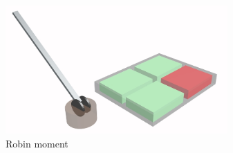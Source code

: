 \begin{figure}
	\centering
	\includegraphics[width=85mm]{./pictures/RobinMoment.jpg}
	\caption{Robin moment}
	\label{fig:rmoment}
\end{figure}
